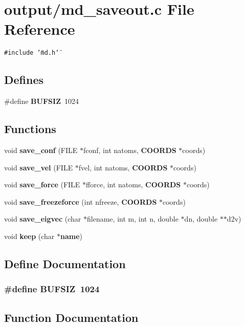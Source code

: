 \section{output/md\_\-saveout.c File Reference}
\label{md__saveout_8c}
{\tt \#include \char`\"{}md.h\char`\"{}}\par
\subsection*{Defines}
\begin{CompactItemize}
\item 
\#define {\bf BUFSIZ}~1024
\end{CompactItemize}
\subsection*{Functions}
\begin{CompactItemize}
\item 
void {\bf save\_\-conf} (FILE $\ast$fconf, int natoms, {\bf COORDS} $\ast$coords)
\item 
void {\bf save\_\-vel} (FILE $\ast$fvel, int natoms, {\bf COORDS} $\ast$coords)
\item 
void {\bf save\_\-force} (FILE $\ast$fforce, int natoms, {\bf COORDS} $\ast$coords)
\item 
void {\bf save\_\-freezeforce} (int nfreeze, {\bf COORDS} $\ast$coords)
\item 
void {\bf save\_\-eigvec} (char $\ast$filename, int m, int n, double $\ast$dn, double $\ast$$\ast$d2v)
\item 
void {\bf keep} (char $\ast${\bf name})
\end{CompactItemize}


\subsection{Define Documentation}
\subsubsection{\setlength{\rightskip}{0pt plus 5cm}\#define BUFSIZ~1024}\label{md__saveout_8c_72a591cf0a96cf23c63df5c78712dabe}




\subsection{Function Documentation}
